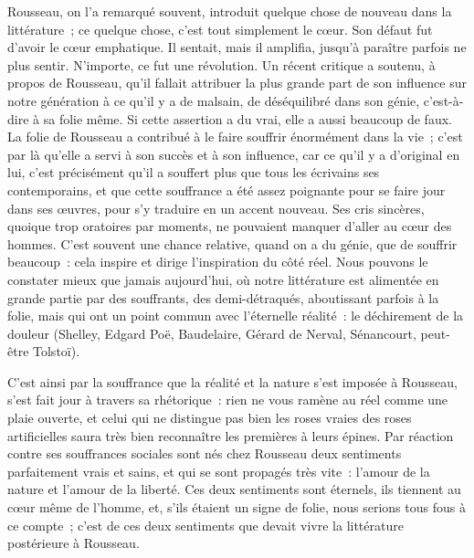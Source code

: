 \documentclass[french,twoside]{book} %
\begin{document}
Rousseau, on l’a remarqué souvent, introduit quelque chose de nouveau dans la littérature ; ce quelque chose, c’est tout simplement le cœur. Son défaut fut d’avoir le cœur emphatique. Il sentait, mais il amplifia, jusqu’à paraître parfois ne plus sentir. N’importe, ce fut une révolution. Un récent critique a soutenu, à propos de Rousseau, qu’il fallait attribuer la plus grande part de son influence sur notre génération à ce qu’il y a de malsain, de déséquilibré dans son génie, c’est-à-dire à sa folie même. Si cette assertion a du vrai, elle a aussi beaucoup de faux. La folie de Rousseau a contribué à le faire souffrir énormément dans la vie ; c’est par là qu’elle a servi à son succès et à son influence, car ce qu’il y a d’original en lui, c’est précisément qu’il a souffert plus que tous les écrivains ses contemporains, et que cette souffrance a été assez poignante pour se faire jour dans ses œuvres, pour s’y traduire en un accent nouveau. Ses cris sincères, quoique trop oratoires par moments, ne pouvaient manquer d’aller au cœur des hommes. C’est souvent une chance relative, quand on a du génie, que de souffrir beaucoup : cela inspire et dirige l’inspiration du côté réel. Nous pouvons le constater mieux que jamais aujourd’hui, où notre littérature est alimentée en grande partie par des souffrants, des demi-détraqués, aboutissant parfois à la folie, mais qui ont un point commun avec l’éternelle réalité : le déchirement de la douleur (Shelley, Edgard Poë, Baudelaire, Gérard de Nerval, Sénancourt, peut-être Tolstoï).\par
C’est ainsi par la souffrance que la réalité et la nature s’est imposée à Rousseau, s’est fait jour à travers sa rhétorique : rien ne vous ramène au réel comme une plaie ouverte, et celui qui ne distingue pas bien les roses vraies des roses artificielles saura très bien reconnaître les premières à leurs épines. Par réaction contre ses souffrances sociales sont nés chez Rousseau deux sentiments parfaitement vrais et sains, et qui se sont propagés très vite : l’amour de la nature et l’amour de la liberté. Ces deux sentiments sont éternels, ils tiennent au cœur même de l’homme, et, s’ils étaient un signe de folie, nous serions tous fous à ce compte ; c’est de ces deux sentiments que devait vivre la littérature postérieure à Rousseau.\par
\end{document}
